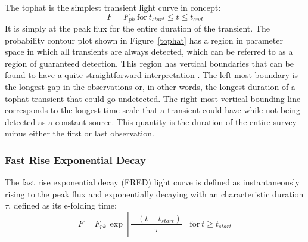\documentclass[12pt]{article}
\begin{document}
The tophat is the simplest transient light curve in concept:
\begin{equation}
F=F_{pk}~\text{for}~t_{start} \le t \le t_{end}
\end{equation}
It is simply at the peak flux for the entire duration of the transient. The probability contour plot shown in Figure~\ref{tophat} has a region in parameter space in which all transients are always detected, which can be referred to as a region of guaranteed detection. This region has vertical boundaries that can be found to have a quite straightforward interpretation \citep{2017MNRAS.465.4106C}. The left-most boundary is the longest gap in the observations or, in other words, the longest duration of a tophat transient that could go undetected. The right-most vertical bounding line corresponds to the longest time scale that a transient could have while not being detected as a constant source. This quantity is the duration of the entire survey minus either the first or last observation. 

\subsubsection{Fast Rise Exponential Decay}
The fast rise exponential decay (FRED) light curve is defined as instantaneously rising to the peak flux and exponentially decaying with an characteristic duration $\tau$, defined as its e-folding time:
\begin{equation}
F=F_{pk}\,\exp\left[\frac{-(t-t_{start})}{\tau}\right]~\text{for}~t\ge t_{start}
\end{equation}
\end{document}
